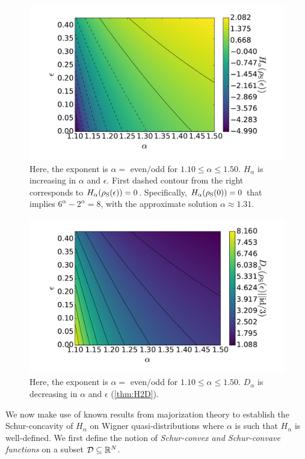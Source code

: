 \documentclass[pra,
aps,
twocolumn,
superscriptaddress,
groupedaddress,
nofootinbib,
reprint
]{revtex4-1}
\begin{document}
\begin{figure}[h]
    \centering
    \includegraphics[scale=0.3]{figs/test/H_vs_eps_a.pdf}
    \caption{Here, the exponent is $\alpha =$ even$/$odd for $1.10 \leq \alpha \leq 1.50$. $H_\alpha$ is increasing in $\alpha$ and $\epsilon$. First dashed contour from the right corresponds to $H_\alpha(\rho_{\rm{S}}(\epsilon)) = 0$. Specifically, $H_\alpha(\rho_{\rm{S}}(0)) = 0$ that implies $6^\alpha - 2^{\alpha} = 8$, with the approximate solution $\alpha \approx 1.31$.
    }
    \label{fig:H}
\end{figure}

\begin{figure}[h]
    \centering
    \includegraphics[scale=0.3]{figs/test/D_vs_eps_a.pdf}
    \caption{Here, the exponent is $\alpha =$ even$/$odd for $1.10 \leq \alpha \leq 1.50$. $D_\alpha$ is decreasing in $\alpha$ and $\epsilon$ (\cref{thm:H2D}).
    }
    \label{fig:D}
\end{figure}

We now make use of known results from majorization theory to establish the Schur-concavity of $H_\alpha$ on Wigner quasi-distributions where $\alpha$ is such that $H_\alpha$ is well-defined. 
We first define the notion of \emph{Schur-convex and Schur-convave functions} on a subset ${\mathcal D} \subseteq \mathbb{R}^N$.
\end{document}
